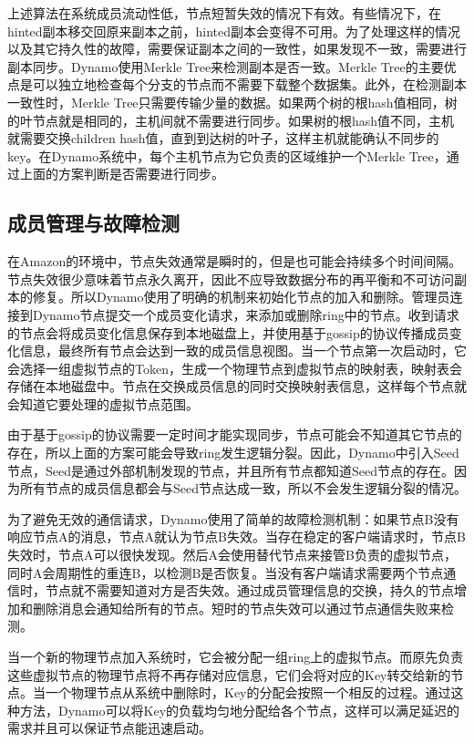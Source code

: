 \documentclass[UTF8]{article}
\begin{document}
上述算法在系统成员流动性低，节点短暂失效的情况下有效。有些情况下，在hinted副本移交回原来副本之前，hinted副本会变得不可用。为了处理这样的情况以及其它持久性的故障，需要保证副本之间的一致性，如果发现不一致，需要进行副本同步。Dynamo使用Merkle Tree来检测副本是否一致。Merkle Tree的主要优点是可以独立地检查每个分支的节点而不需要下载整个数据集。此外，在检测副本一致性时，Merkle Tree只需要传输少量的数据。如果两个树的根hash值相同，树的叶节点就是相同的，主机间就不需要进行同步。如果树的根hash值不同，主机就需要交换children hash值，直到到达树的叶子，这样主机就能确认不同步的key。在Dynamo系统中，每个主机节点为它负责的区域维护一个Merkle Tree，通过上面的方案判断是否需要进行同步。

	\subsection{成员管理与故障检测}
		在Amazon的环境中，节点失效通常是瞬时的，但是也可能会持续多个时间间隔。节点失效很少意味着节点永久离开，因此不应导致数据分布的再平衡和不可访问副本的修复。所以Dynamo使用了明确的机制来初始化节点的加入和删除。管理员连接到Dynamo节点提交一个成员变化请求，来添加或删除ring中的节点。收到请求的节点会将成员变化信息保存到本地磁盘上，并使用基于gossip的协议传播成员变化信息，最终所有节点会达到一致的成员信息视图。当一个节点第一次启动时，它会选择一组虚拟节点的Token，生成一个物理节点到虚拟节点的映射表，映射表会存储在本地磁盘中。节点在交换成员信息的同时交换映射表信息，这样每个节点就会知道它要处理的虚拟节点范围。
		
		由于基于gossip的协议需要一定时间才能实现同步，节点可能会不知道其它节点的存在，所以上面的方案可能会导致ring发生逻辑分裂。因此，Dynamo中引入Seed节点，Seed是通过外部机制发现的节点，并且所有节点都知道Seed节点的存在。因为所有节点的成员信息都会与Seed节点达成一致，所以不会发生逻辑分裂的情况。
		
		为了避免无效的通信请求，Dynamo使用了简单的故障检测机制：如果节点B没有响应节点A的消息，节点A就认为节点B失效。当存在稳定的客户端请求时，节点B失效时，节点A可以很快发现。然后A会使用替代节点来接管B负责的虚拟节点，同时A会周期性的重连B，以检测B是否恢复。当没有客户端请求需要两个节点通信时，节点就不需要知道对方是否失效。通过成员管理信息的交换，持久的节点增加和删除消息会通知给所有的节点。短时的节点失效可以通过节点通信失败来检测。

		当一个新的物理节点加入系统时，它会被分配一组ring上的虚拟节点。而原先负责这些虚拟节点的物理节点将不再存储对应信息，它们会将对应的Key转交给新的节点。当一个物理节点从系统中删除时，Key的分配会按照一个相反的过程。通过这种方法，Dynamo可以将Key的负载均匀地分配给各个节点，这样可以满足延迟的需求并且可以保证节点能迅速启动。		
		
\end{document}
